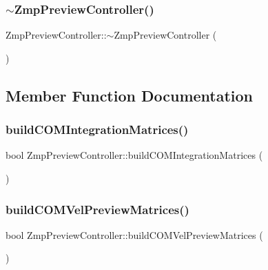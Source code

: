 \hypertarget{classZmpPreviewController_af702c45f318c7a78310d19cc061886dd}{}\label{classZmpPreviewController_af702c45f318c7a78310d19cc061886dd} 
\subsubsection{\texorpdfstring{$\sim$\+Zmp\+Preview\+Controller()}{~ZmpPreviewController()}}
{\footnotesize\ttfamily Zmp\+Preview\+Controller\+::$\sim$\+Zmp\+Preview\+Controller (\begin{DoxyParamCaption}{ }\end{DoxyParamCaption})}



\subsection{Member Function Documentation}
\hypertarget{classZmpPreviewController_a378a6408072c1d7b962e8e52af30b634}{}\label{classZmpPreviewController_a378a6408072c1d7b962e8e52af30b634} 
\subsubsection{\texorpdfstring{build\+C\+O\+M\+Integration\+Matrices()}{buildCOMIntegrationMatrices()}}
{\footnotesize\ttfamily bool Zmp\+Preview\+Controller\+::build\+C\+O\+M\+Integration\+Matrices (\begin{DoxyParamCaption}{ }\end{DoxyParamCaption})}

\hypertarget{classZmpPreviewController_aa763d1c7a769f21eeaaaeb3f09a32aef}{}\label{classZmpPreviewController_aa763d1c7a769f21eeaaaeb3f09a32aef} 
\subsubsection{\texorpdfstring{build\+C\+O\+M\+Vel\+Preview\+Matrices()}{buildCOMVelPreviewMatrices()}}
{\footnotesize\ttfamily bool Zmp\+Preview\+Controller\+::build\+C\+O\+M\+Vel\+Preview\+Matrices (\begin{DoxyParamCaption}{ }\end{DoxyParamCaption})}

